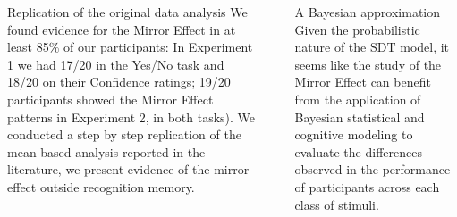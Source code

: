 \documentclass[final]{beamer}
\newlength{\sepwid}
\newlength{\onecolwid}
\newlength{\twocolwid}
\begin{document}
\begin{frame}[t]
\begin{columns}[t]
\begin{column}{\onecolwid}
\begin{alertblock}{Replication of the original data analysis}
We found evidence for the Mirror Effect in at least 85\% of our participants: In Experiment 1 we had 17/20 in the Yes/No task and 18/20 on their Confidence ratings; 19/20 participants showed the Mirror Effect patterns in Experiment 2, in both tasks). We conducted a step by step replication of the mean-based analysis reported in the literature, we present evidence of the mirror effect outside recognition memory. 
\end{alertblock} 


\end{column} %
\begin{column}{\sepwid}\end{column} %
\begin{column}{\twocolwid} %



\begin{alertblock}{A Bayesian approximation}
Given the probabilistic nature of the SDT model, it seems like the study of the Mirror Effect can benefit from the application of Bayesian statistical and cognitive modeling to evaluate the differences observed in the performance of participants across each class of stimuli.
\end{alertblock} 

\setlength{\onecolwid}{0.24\paperwidth}
\begin{columns}[t,totalwidth=\twocolwid] %
\begin{column}{\onecolwid}\vspace{-.6in} %



\end{column}
\end{columns}
\end{column}
\end{columns}
\end{frame}
\end{document}
